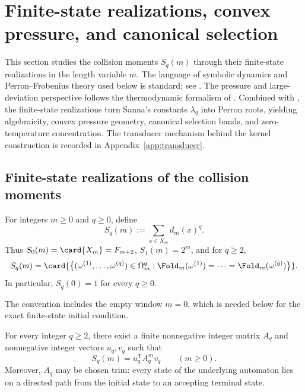 ﻿\section{Finite-state realizations, convex pressure, and canonical selection}
\label{sec:moment-kernel}

This section studies the collision moments \(S_q(m)\) through their finite-state
realizations in the length variable \(m\).  The language of symbolic dynamics
and Perron--Frobenius theory used below is standard; see
\cite{LindMarcus1995,Seneta2006}.  The pressure and large-deviation
perspective follows the thermodynamic formalism of
\cite{DemboZeitouni2010}.  Combined with , the
finite-state realizations turn Sanna's constants \(\lambda_q\) into
Perron roots, yielding algebraicity, convex pressure geometry, canonical
selection bands, and zero-temperature concentration.  The transducer
mechanism behind the kernel construction is recorded in
Appendix~\ref{app:transducer}.

\subsection{Finite-state realizations of the collision moments}

\begin{definition}
\label{def:collision-moments}
For integers \(m\ge 0\) and \(q\ge 0\), define
\[
  S_q(m):=\sum_{x\in X_m} d_m(x)^q.
\]
Thus \(S_0(m)=\card{X_m}=F_{m+2}\), \(S_1(m)=2^m\), and for \(q\ge 2\),
\[
  S_q(m)
  =
  \card{\bigl\{(\omega^{(1)},\dots,\omega^{(q)})\in\Omega_m^q:
  \Fold_m(\omega^{(1)})=\cdots=\Fold_m(\omega^{(q)})\bigr\}}.
\]
In particular, \(S_q(0)=1\) for every \(q\ge0\).
\end{definition}

\begin{remark}
The convention includes the empty window \(m=0\), which is needed below for the
exact finite-state initial condition.
\end{remark}

\begin{theorem}
\label{thm:collision-kernel}
For every integer \(q\ge 2\), there exist a finite nonnegative integer matrix
\(A_q\) and nonnegative integer vectors \(u_q,v_q\) such that
\[
  S_q(m)=u_q^{\mathsf T}A_q^m v_q
  \qquad (m\ge 0).
\]
Moreover, \(A_q\) may be chosen trim: every state of the underlying automaton
lies on a directed path from the initial state to an accepting terminal state.
\end{theorem}

